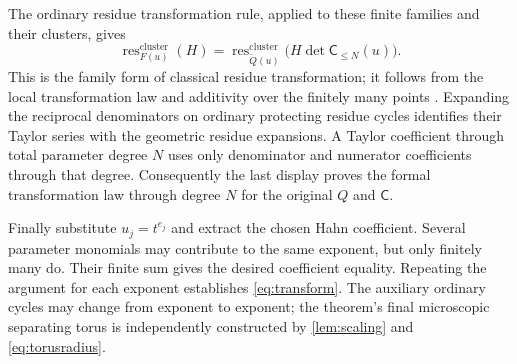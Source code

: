 \documentclass[11pt,letterpaper]{article}
\theoremstyle{definition}
\theoremstyle{remark}
\newcommand{\res}{\operatorname{res}}
\numberwithin{equation}{section}
\begin{document}
The ordinary residue transformation rule, applied to these finite families and their clusters, gives
\[
\res_{F(u)}^{\mathrm{cluster}}(H)
=\res_{\widetilde Q(u)}^{\mathrm{cluster}}
 \bigl(H\det\mathsf C_{\le N}(u)\bigr).
\]
This is the family form of classical residue transformation; it follows from the local transformation law and additivity over the finitely many points \cite{CDS}. Expanding the reciprocal denominators on ordinary protecting residue cycles identifies their Taylor series with the geometric residue expansions. A Taylor coefficient through total parameter degree $N$ uses only denominator and numerator coefficients through that degree. Consequently the last display proves the formal transformation law through degree $N$ for the original $Q$ and $\mathsf C$.

Finally substitute $u_j=t^{e_j}$ and extract the chosen Hahn coefficient. Several parameter monomials may contribute to the same exponent, but only finitely many do. Their finite sum gives the desired coefficient equality. Repeating the argument for each exponent establishes \eqref{eq:transform}. The auxiliary ordinary cycles may change from exponent to exponent; the theorem's final microscopic separating torus is independently constructed by \cref{lem:scaling} and \eqref{eq:torusradius}.
\end{document}
